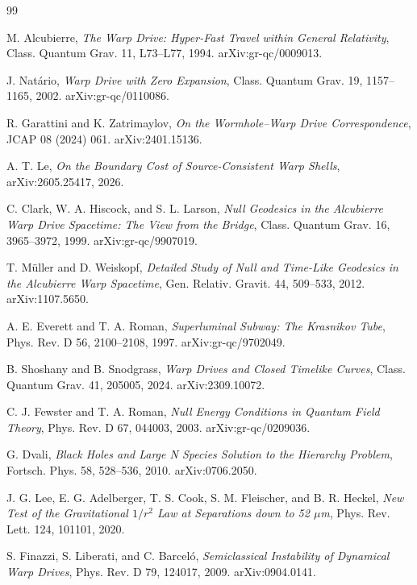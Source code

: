 \documentclass[11pt]{article}
\begin{document}
\begin{thebibliography}{99}

M. Alcubierre,
\textit{The Warp Drive: Hyper-Fast Travel within General Relativity},
Class. Quantum Grav. 11, L73--L77, 1994.
arXiv:gr-qc/0009013.

J. Nat\'ario,
\textit{Warp Drive with Zero Expansion},
Class. Quantum Grav. 19, 1157--1165, 2002.
arXiv:gr-qc/0110086.

R. Garattini and K. Zatrimaylov,
\textit{On the Wormhole--Warp Drive Correspondence},
JCAP 08 (2024) 061.
arXiv:2401.15136.

A. T. Le,
\textit{On the Boundary Cost of Source-Consistent Warp Shells},
arXiv:2605.25417, 2026.

C. Clark, W. A. Hiscock, and S. L. Larson,
\textit{Null Geodesics in the Alcubierre Warp Drive Spacetime: The View from the Bridge},
Class. Quantum Grav. 16, 3965--3972, 1999.
arXiv:gr-qc/9907019.

T. M{\"u}ller and D. Weiskopf,
\textit{Detailed Study of Null and Time-Like Geodesics in the Alcubierre Warp Spacetime},
Gen. Relativ. Gravit. 44, 509--533, 2012.
arXiv:1107.5650.

A. E. Everett and T. A. Roman,
\textit{Superluminal Subway: The Krasnikov Tube},
Phys. Rev. D 56, 2100--2108, 1997.
arXiv:gr-qc/9702049.

B. Shoshany and B. Snodgrass,
\textit{Warp Drives and Closed Timelike Curves},
Class. Quantum Grav. 41, 205005, 2024.
arXiv:2309.10072.

C. J. Fewster and T. A. Roman,
\textit{Null Energy Conditions in Quantum Field Theory},
Phys. Rev. D 67, 044003, 2003.
arXiv:gr-qc/0209036.

G. Dvali,
\textit{Black Holes and Large N Species Solution to the Hierarchy Problem},
Fortsch. Phys. 58, 528--536, 2010.
arXiv:0706.2050.

J. G. Lee, E. G. Adelberger, T. S. Cook, S. M. Fleischer, and B. R. Heckel,
\textit{New Test of the Gravitational $1/r^2$ Law at Separations down to 52 $\mu$m},
Phys. Rev. Lett. 124, 101101, 2020.

S. Finazzi, S. Liberati, and C. Barcel\'o,
\textit{Semiclassical Instability of Dynamical Warp Drives},
Phys. Rev. D 79, 124017, 2009.
arXiv:0904.0141.


\end{thebibliography}
\end{document}
